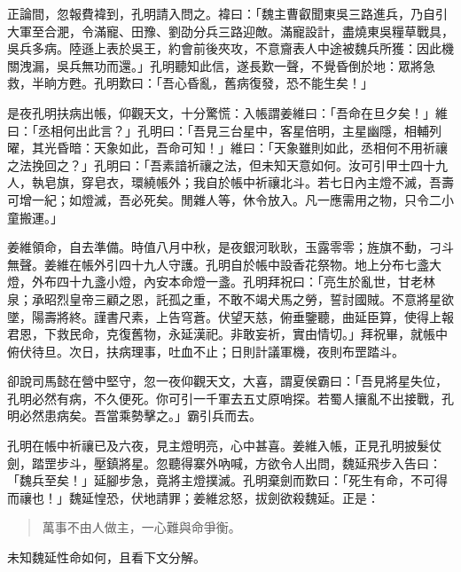正論間，忽報費褘到，孔明請入問之。褘曰：「魏主曹叡聞東吳三路進兵，乃自引大軍至合淝，令滿寵、田豫、劉劭分兵三路迎敵。滿寵設計，盡燒東吳糧草戰具，吳兵多病。陸遜上表於吳王，約會前後夾攻，不意齎表人中途被魏兵所獲：因此機關洩漏，吳兵無功而還。」孔明聽知此信，遂長歎一聲，不覺昏倒於地：眾將急救，半晌方甦。孔明歎曰：「吾心昏亂，舊病復發，恐不能生矣！」

是夜孔明扶病出帳，仰觀天文，十分驚慌：入帳謂姜維曰：「吾命在旦夕矣！」維曰：「丞相何出此言？」孔明曰：「吾見三台星中，客星倍明，主星幽隱，相輔列曜，其光昏暗：天象如此，吾命可知！」維曰：「天象雖則如此，丞相何不用祈禳之法挽回之？」孔明曰：「吾素諳祈禳之法，但未知天意如何。汝可引甲士四十九人，執皂旗，穿皂衣，環繞帳外；我自於帳中祈禳北斗。若七日內主燈不滅，吾壽可增一紀；如燈滅，吾必死矣。閒雜人等，休令放入。凡一應需用之物，只令二小童搬運。」

姜維領命，自去準備。時值八月中秋，是夜銀河耿耿，玉露零零；旌旗不動，刁斗無聲。姜維在帳外引四十九人守護。孔明自於帳中設香花祭物。地上分布七盞大燈，外布四十九盞小燈，內安本命燈一盞。孔明拜祝曰：「亮生於亂世，甘老林泉；承昭烈皇帝三顧之恩，託孤之重，不敢不竭犬馬之勞，誓討國賊。不意將星欲墜，陽壽將終。謹書尺素，上告穹蒼。伏望天慈，俯垂鑒聽，曲延臣算，使得上報君恩，下救民命，克復舊物，永延漢祀。非敢妄祈，實由情切。」拜祝畢，就帳中俯伏待旦。次日，扶病理事，吐血不止；日則計議軍機，夜則布罡踏斗。

卻說司馬懿在營中堅守，忽一夜仰觀天文，大喜，謂夏侯霸曰：「吾見將星失位，孔明必然有病，不久便死。你可引一千軍去五丈原哨探。若蜀人攘亂不出接戰，孔明必然患病矣。吾當乘勢擊之。」霸引兵而去。

孔明在帳中祈禳已及六夜，見主燈明亮，心中甚喜。姜維入帳，正見孔明披髮仗劍，踏罡步斗，壓鎮將星。忽聽得寨外吶喊，方欲令人出問，魏延飛步入告曰：「魏兵至矣！」延腳步急，竟將主燈撲滅。孔明棄劍而歎曰：「死生有命，不可得而禳也！」魏延惶恐，伏地請罪；姜維忿怒，拔劍欲殺魏延。正是：

\begin{quote}
萬事不由人做主，一心難與命爭衡。
\end{quote}

未知魏延性命如何，且看下文分解。
